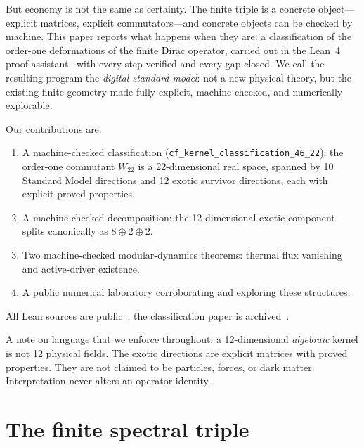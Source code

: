 \documentclass[aps,prd,twocolumn,superscriptaddress,showpacs]{revtex4-2}
\begin{document}
But economy is not the same as certainty. The finite triple is a
concrete object---explicit matrices, explicit commutators---and
concrete objects can be checked by machine. This paper reports what
happens when they are: a classification of the order-one deformations
of the finite Dirac operator, carried out in the Lean~4 proof
assistant~\cite{lean4} with every step verified and every gap closed.
We call the resulting program the \emph{digital standard model}:
not a new physical theory, but the existing finite geometry made
fully explicit, machine-checked, and numerically explorable.

Our contributions are:
\begin{enumerate}
\item A machine-checked classification (\texttt{cf\_kernel\_classification\_46\_22}):
the order-one commutant $W_{22}$ is a 22-dimensional real space,
spanned by 10 Standard Model directions and 12 exotic survivor
directions, each with explicit proved properties.
\item A machine-checked decomposition: the 12-dimensional exotic
component splits canonically as $8 \oplus 2 \oplus 2$.
\item Two machine-checked modular-dynamics theorems: thermal flux
vanishing and active-driver existence.
\item A public numerical laboratory corroborating and exploring
these structures.
\end{enumerate}
All Lean sources are public~\cite{thetlogos}; the classification
paper is archived~\cite{zenodo}.

A note on language that we enforce throughout: a 12-dimensional
\emph{algebraic} kernel is not 12 physical fields. The exotic
directions are explicit matrices with proved properties. They are
not claimed to be particles, forces, or dark matter. Interpretation
never alters an operator identity.

\section{The finite spectral triple}
\end{document}
